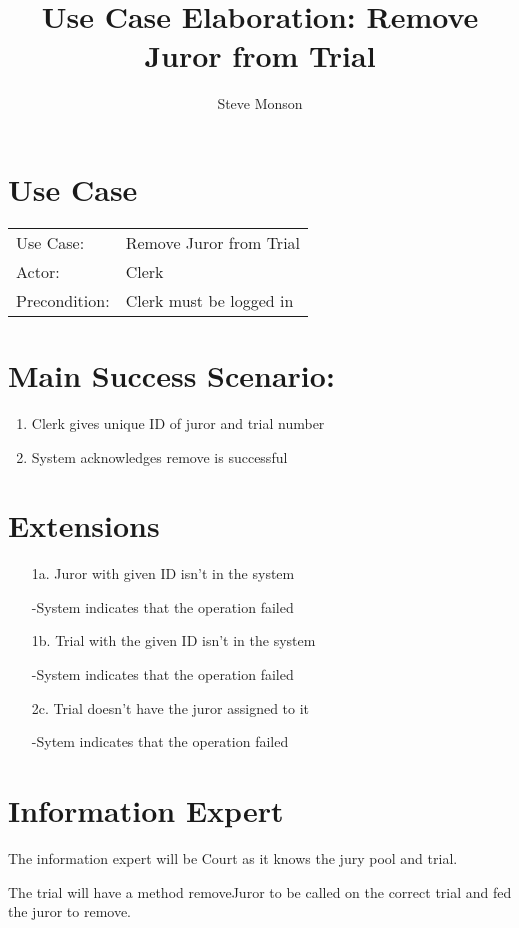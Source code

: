 \documentclass{article}
\title{Use Case Elaboration: Remove Juror from Trial}
\author{Steve Monson}
\begin{document}
\maketitle

\section*{Use Case}
\begin{tabular}{l l}
  Use Case:     & Remove Juror from Trial\\
  Actor:        & Clerk\\
  Precondition: & Clerk must be logged in\\
\end{tabular}

\section*{Main Success Scenario:}
\begin{enumerate}
  \item Clerk gives unique ID of juror and trial number
  \item System acknowledges remove is successful
\end{enumerate}

\section*{Extensions}
\begin{itemize}
  \item [1a.] Juror with given ID isn't in the system
  
    -System indicates that the operation failed
  
  \item [1b.] Trial with the given ID isn't in the system

    -System indicates that the operation failed
    
  \item [2c.] Trial doesn't have the juror assigned to it
  
    -Sytem indicates that the operation failed

\end{itemize}

\section*{Information Expert}

The information expert will be Court as it knows the jury pool and trial.

The trial will have a method removeJuror to be called on the correct trial and fed the juror to remove. 
\end{document}
